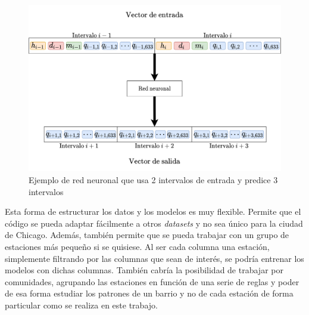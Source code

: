 \begin{figure}[H]
    \centering
    \includegraphics[width=14cm]{images/solution/preprocessing/models-design-2.png}
    \caption{Ejemplo de red neuronal que usa 2 intervalos de entrada y predice 3 intervalos}
        \label{fig:models-design-2}
\end{figure}


Esta forma de estructurar los datos y los modelos es muy flexible. Permite que el código se pueda adaptar fácilmente a otros \textit{datasets} y no sea único para la ciudad de Chicago. Además, también permite que se pueda trabajar con un grupo de estaciones más pequeño si se quisiese. Al ser cada columna una estación, simplemente filtrando por las columnas que sean de interés, se podría entrenar los modelos con dichas columnas. También cabría la posibilidad de trabajar por comunidades, agrupando las estaciones en función de una serie de reglas y poder de esa forma estudiar los patrones de un barrio y no de cada estación de forma particular como se realiza en este trabajo.
\newline